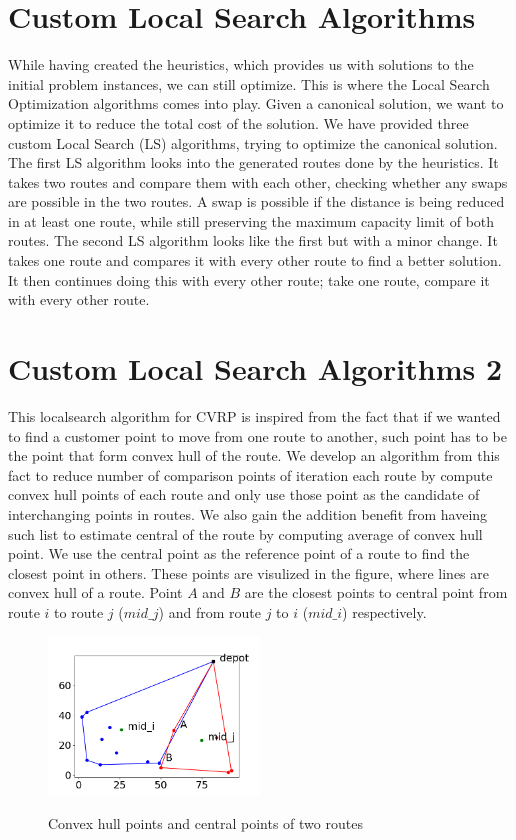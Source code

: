 \documentclass[12pt]{article}
\begin{document}
\section{Custom Local Search Algorithms}
While having created the heuristics, which provides us with solutions to the initial problem instances, we can still optimize. This is where the Local Search Optimization algorithms comes into play. 
Given a canonical solution, we want to optimize it to reduce the total cost of the solution. We have provided three custom Local Search (LS) algorithms, trying to optimize the canonical solution. 
\newline
The first LS algorithm looks into the generated routes done by the heuristics. It takes two routes and compare them with each other, checking whether any swaps are possible in the two routes. 
A swap is possible if the distance is being reduced in at least one route, while still preserving the maximum capacity limit of both routes. 
The second LS algorithm looks like the first but with a minor change. It takes one route and compares it with every other route to find a better solution. It then continues doing this 
with every other route; take one route, compare it with every other route. 

\section{Custom Local Search Algorithms 2} \label{ls2}
This localsearch algorithm for CVRP is inspired from the fact that if we wanted to find a customer point to move from one route to another, such point has to be the point that form convex hull of the route. We develop an algorithm from this fact to reduce number of comparison points of iteration each route by compute convex hull points of each route and only use those point as the candidate of interchanging points in routes. We also gain the addition benefit from haveing such list to estimate central of the route by computing average of convex hull point. We use the central point as the reference point of a route to find the closest point in others. These points are visulized in the figure, where lines are convex hull of a route. Point \(A\) and \(B\) are the closest points to central point from route \(i\) to route \(j\) (\(mid\_j\)) and from route \(j\) to \(i\) (\(mid\_i\)) respectively.

\begin{figure}[H]
	\caption{Convex hull points and central points of two routes}
	\centering
	\includegraphics[width=0.5\textwidth]{convexmidclosest.png}
	\label{fig:localsearch1}

\end{figure}
\end{document}
